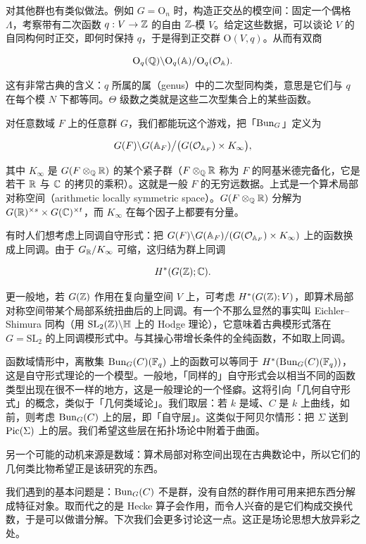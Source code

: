 
对其他群也有类似做法。例如 $G=\mathrm{O}_n$ 时，构造正交丛的模空间：固定一个偶格 $\Lambda$，考察带有二次函数 $q:V\to\mathbb{Z}$ 的自由 $\mathbb{Z}$-模 $V$。给定这些数据，可以谈论 $V$ 的自同构何时正交，即何时保持 $q$，于是得到正交群 $\mathrm{O}(V,q)$。从而有双商

\[\mathrm{O}_q(\mathbb{Q})\backslash \mathrm{O}_q(\mathbb{A})/\mathrm{O}_q(\mathcal{O}_{\mathbb{A}}).\]

这有非常古典的含义：$q$ 所属的属（genus）中的二次型同构类，意思是它们与 $q$ 在每个模 $N$ 下都等同。$\Theta$ 级数之类就是这些二次型集合上的某些函数。

对任意数域 $F$ 上的任意群 $G$，我们都能玩这个游戏，把「$\mathrm{Bun}_G$」定义为

\[G(F)\backslash G(\mathbb{A}_F)\big/\big(G(\mathcal{O}_{\mathbb{A}_F})\times K_\infty\big),\]

其中 $K_\infty$ 是 $G(F\otimes_{\mathbb{Q}}\mathbb{R})$ 的某个紧子群（$F\otimes_{\mathbb{Q}}\mathbb{R}$ 称为 $F$ 的阿基米德完备化，它是若干 $\mathbb{R}$ 与 $\mathbb{C}$ 的拷贝的乘积）。这就是一般 $F$ 的无穷远数据。上式是一个算术局部对称空间（arithmetic locally symmetric space）。$G(F\otimes_{\mathbb{Q}}\mathbb{R})$ 分解为 $G(\mathbb{R})^{\times s}\times G(\mathbb{C})^{\times t}$，而 $K_\infty$ 在每个因子上都要有分量。

有时人们想考虑上同调自守形式：把 $G(F)\backslash G(\mathbb{A}_F)/(G(\mathcal{O}_{\mathbb{A}_F})\times K_\infty)$ 上的函数换成上同调。由于 $G_{\mathbb{R}}/K_\infty$ 可缩，这归结为群上同调

\[H^*(G(\mathbb{Z});\mathbb{C}).\]

更一般地，若 $G(\mathbb{Z})$ 作用在复向量空间 $V$ 上，可考虑 $H^*(G(\mathbb{Z});V)$，即算术局部对称空间带某个局部系统扭曲后的上同调。有一个不那么显然的事实叫 Eichler–Shimura 同构（用 $\mathrm{SL}_2(\mathbb{Z})\backslash\mathbb{H}$ 上的 Hodge 理论），它意味着古典模形式落在 $G=\mathrm{SL}_2$ 的上同调模形式中。与其操心带增长条件的全纯函数，不如取上同调。

函数域情形中，离散集 $\mathrm{Bun}_G(C)(\mathbb{F}_q)$ 上的函数可以等同于 $H^*(\mathrm{Bun}_G(C)(\mathbb{F}_q))$，这是自守形式理论的一个模型。一般地，「同样的」自守形式会以相当不同的函数类型出现在很不一样的地方，这是一般理论的一个怪癖。这将引向「几何自守形式」的概念，类似于「几何类域论」。我们取层：若 $k$ 是域、$C$ 是 $k$ 上曲线，如前，则考虑 $\mathrm{Bun}_G(C)$ 上的层，即「自守层」。这类似于阿贝尔情形：把 $\Sigma$ 送到 $\operatorname{Pic}(\Sigma)$ 上的层。我们希望这些层在拓扑场论中附着于曲面。

另一个可能的动机来源是数域：算术局部对称空间出现在古典数论中，所以它们的几何类比物希望正是该研究的东西。

我们遇到的基本问题是：$\mathrm{Bun}_G(C)$ 不是群，没有自然的群作用可用来把东西分解成特征对象。取而代之的是 Hecke 算子会作用，而令人兴奋的是它们构成交换代数，于是可以做谱分解。下次我们会更多讨论这一点。这正是场论思想大放异彩之处。
